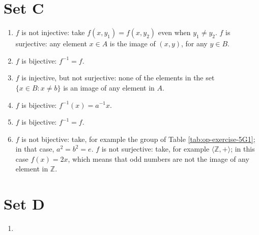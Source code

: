 \documentclass{article}
\newcommand{\angled}[1]{\langle#1\rangle}
\begin{document}
\section{Set C}
\begin{enumerate}
    \item $f$ is not injective: take $f(x, y_1) = f(x, y_2)$ even when $y_1 \ne y_2$. $f$ is surjective: any element $x \in A$ is the image of $(x, y)$, for any $y \in B$.

    \item $f$ is bijective: $f^{-1} = f$.

    \item $f$ is injective, but not surjective: none of the elements in the set $\{x \in B: x \ne b\}$ is an image of any element in $A$.

    \item $f$ is bijective: $f^{-1}(x) = a^{-1}x$.

    \item $f$ is bijective: $f^{-1} = f$.

    \item $f$ is not bijective: take, for example the group of Table \ref{tab:op-exercise-5G1}; in that case, $a^2 = b^2 = e$. $f$ is not surjective: take, for example $\angled{\mathbb{Z}, +}$; in this case $f(x) = 2x$, which means that odd numbers are not the image of any element in $\mathbb{Z}$.
\end{enumerate}

\section{Set D}
\begin{enumerate}
    \item 
\end{enumerate}
\end{document}
